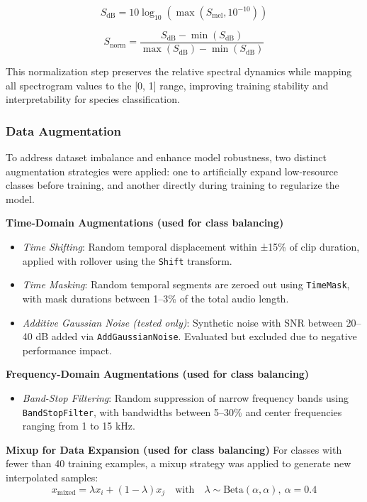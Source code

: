 \documentclass[ERTS, 2025]{ERTS}
\begin{document}
\begin{equation}
S_{\text{dB}} = 10 \log_{10}\left(\max(S_{\text{mel}}, 10^{-10})\right)
\end{equation}

\begin{equation}
S_{\text{norm}} = \frac{S_{\text{dB}} - \min(S_{\text{dB}})}{\max(S_{\text{dB}}) - \min(S_{\text{dB}})}
\end{equation}

This normalization step preserves the relative spectral dynamics while mapping all spectrogram values to the [0, 1] range, improving training stability and interpretability for species classification.
\subsubsection{Data Augmentation}
To address dataset imbalance and enhance model robustness, two distinct augmentation strategies were applied: one to artificially expand low-resource classes before training, and another directly during training to regularize the model.

\textbf{Time-Domain Augmentations (used for class balancing)}
\begin{itemize}
    \item \textit{Time Shifting}: Random temporal displacement within ±15\% of clip duration, applied with rollover using the \texttt{Shift} transform.
    \item \textit{Time Masking}: Random temporal segments are zeroed out using \texttt{TimeMask}, with mask durations between 1–3\% of the total audio length.
    \item \textit{Additive Gaussian Noise (tested only)}: Synthetic noise with SNR between 20–40 dB added via \texttt{AddGaussianNoise}. Evaluated but excluded due to negative performance impact.
\end{itemize}

\textbf{Frequency-Domain Augmentations (used for class balancing)}
\begin{itemize}
    \item \textit{Band-Stop Filtering}: Random suppression of narrow frequency bands using \texttt{BandStopFilter}, with bandwidths between 5–30\% and center frequencies ranging from 1 to 15 kHz.
\end{itemize}

\textbf{Mixup for Data Expansion (used for class balancing)}
For classes with fewer than 40 training examples, a mixup strategy was applied to generate new interpolated samples:
\begin{equation}
x_{\text{mixed}} = \lambda x_i + (1-\lambda) x_j
\quad \text{with} \quad
\lambda \sim \text{Beta}(\alpha, \alpha), \ \alpha = 0.4
\end{equation}
\end{document}
